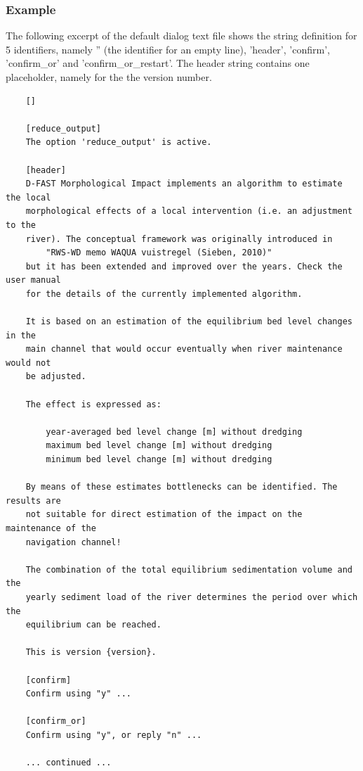 \subsubsection*{Example}

The following excerpt of the default  dialog text file shows the string definition for 5 identifiers, namely '' (the identifier for an empty line), 'header', 'confirm', 'confirm\_or' and 'confirm\_or\_restart'.
The header string contains one placeholder, namely  for the the version number.

\begin{Verbatim}
    []
    
    [reduce_output]
    The option 'reduce_output' is active.
    
    [header]
    D-FAST Morphological Impact implements an algorithm to estimate the local
    morphological effects of a local intervention (i.e. an adjustment to the
    river). The conceptual framework was originally introduced in
        "RWS-WD memo WAQUA vuistregel (Sieben, 2010)"
    but it has been extended and improved over the years. Check the user manual
    for the details of the currently implemented algorithm.
    
    It is based on an estimation of the equilibrium bed level changes in the
    main channel that would occur eventually when river maintenance would not
    be adjusted.
    
    The effect is expressed as:
    
        year-averaged bed level change [m] without dredging
        maximum bed level change [m] without dredging
        minimum bed level change [m] without dredging
    
    By means of these estimates bottlenecks can be identified. The results are
    not suitable for direct estimation of the impact on the maintenance of the
    navigation channel!
    
    The combination of the total equilibrium sedimentation volume and the
    yearly sediment load of the river determines the period over which the
    equilibrium can be reached.
    
    This is version {version}.
    
    [confirm]
    Confirm using "y" ...
    
    [confirm_or]
    Confirm using "y", or reply "n" ...
    
    ... continued ...
\end{Verbatim}

